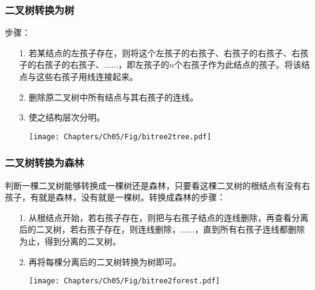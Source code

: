\subsubsection{二叉树转换为树}
\begin{frame}\ft{\subsubsecname}
  步骤：
  \begin{itemize}
  \item[1.]  若某结点的左孩子存在，则将这个左孩子的右孩子、右孩子的右孩子、右孩子的右孩子的右孩子、......，即左孩子的$n$个右孩子作为此结点的孩子。将该结点与这些右孩子用线连接起来。\\[0.1in]
  \item[2.]  删除原二叉树中所有结点与其右孩子的连线。\\[0.1in] 
  \item[3.]  使之结构层次分明。
  \end{itemize}
\end{frame}

\begin{frame}\ft{\subsubsecname}
  \begin{figure}
    \centering
    \texttt{[image: Chapters/Ch05/Fig/bitree2tree.pdf]}
  \end{figure}
\end{frame}

\subsubsection{二叉树转换为森林}
\begin{frame}\ft{\subsubsecname}
  判断一棵二叉树能够转换成一棵树还是森林，只要看这棵二叉树的根结点有没有右孩子，有就是森林，没有就是一棵树。转换成森林的步骤：
  \begin{itemize}
  \item[1.] 从根结点开始，若右孩子存在，则把与右孩子结点的连线删除，再查看分离后的二叉树，若右孩子存在，则连线删除，......，直到所有右孩子连线都删除为止，得到分离的二叉树。\\[0.1in]
  \item[2.] 再将每棵分离后的二叉树转换为树即可。
  \end{itemize}
\end{frame}

\begin{frame}\ft{\subsubsecname}
  \begin{figure}
    \centering
    \texttt{[image: Chapters/Ch05/Fig/bitree2forest.pdf]}
  \end{figure}
\end{frame}

